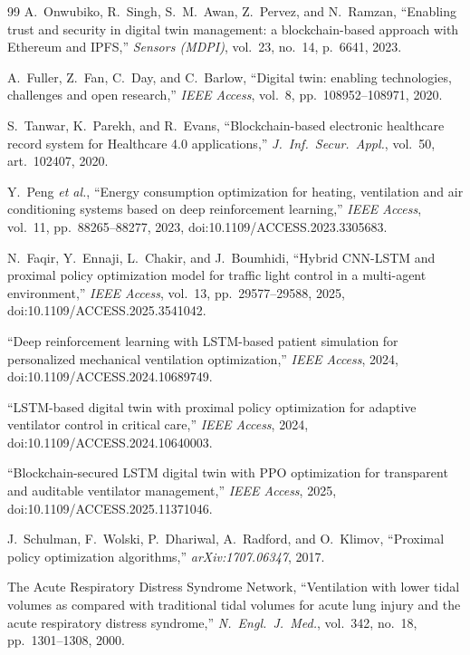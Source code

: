 \documentclass[conference]{IEEEtran}
\begin{document}
\begin{thebibliography}{99}
A.\ Onwubiko, R.\ Singh, S.\ M.\ Awan, Z.\ Pervez, and N.\ Ramzan,
``Enabling trust and security in digital twin management: a blockchain-based approach with Ethereum and IPFS,''
\emph{Sensors (MDPI)}, vol.~23, no.~14, p.~6641, 2023.

A.\ Fuller, Z.\ Fan, C.\ Day, and C.\ Barlow,
``Digital twin: enabling technologies, challenges and open research,''
\emph{IEEE Access}, vol.~8, pp.~108952--108971, 2020.

S.\ Tanwar, K.\ Parekh, and R.\ Evans,
``Blockchain-based electronic healthcare record system for Healthcare 4.0 applications,''
\emph{J.\ Inf.\ Secur.\ Appl.}, vol.~50, art.~102407, 2020.

Y.\ Peng \emph{et al.},
``Energy consumption optimization for heating, ventilation and air conditioning systems based on deep reinforcement learning,''
\emph{IEEE Access}, vol.~11, pp.~88265--88277, 2023, doi:10.1109/ACCESS.2023.3305683.

N.\ Faqir, Y.\ Ennaji, L.\ Chakir, and J.\ Boumhidi,
``Hybrid CNN-LSTM and proximal policy optimization model for traffic light control in a multi-agent environment,''
\emph{IEEE Access}, vol.~13, pp.~29577--29588, 2025, doi:10.1109/ACCESS.2025.3541042.

``Deep reinforcement learning with LSTM-based patient simulation for personalized mechanical ventilation optimization,''
\emph{IEEE Access}, 2024, doi:10.1109/ACCESS.2024.10689749.

``LSTM-based digital twin with proximal policy optimization for adaptive ventilator control in critical care,''
\emph{IEEE Access}, 2024, doi:10.1109/ACCESS.2024.10640003.

``Blockchain-secured LSTM digital twin with PPO optimization for transparent and auditable ventilator management,''
\emph{IEEE Access}, 2025, doi:10.1109/ACCESS.2025.11371046.

J.\ Schulman, F.\ Wolski, P.\ Dhariwal, A.\ Radford, and O.\ Klimov,
``Proximal policy optimization algorithms,''
\emph{arXiv:1707.06347}, 2017.

The Acute Respiratory Distress Syndrome Network,
``Ventilation with lower tidal volumes as compared with traditional tidal volumes for acute lung injury and the acute respiratory distress syndrome,''
\emph{N.\ Engl.\ J.\ Med.}, vol.~342, no.~18, pp.~1301--1308, 2000.


\end{thebibliography}
\end{document}
